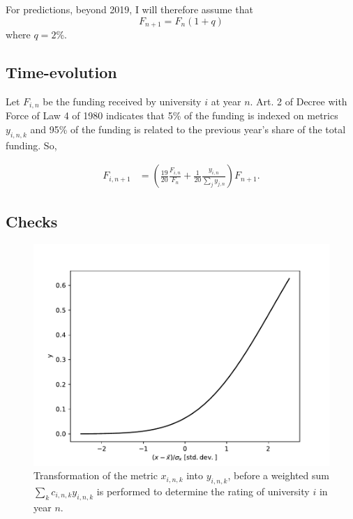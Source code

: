 \documentclass[twocolumn]{article}
\begin{document}
For predictions, beyond 2019, I will therefore assume that
\begin{equation}
    F_{n+1} = F_n (1 + q) \label{eq:F}
\end{equation}
where $q = 2$\%.

\subsection{Time-evolution}
Let $F_{i,n}$ be the funding received by university $i$ at year $n$. Art. 2 of
Decree with Force of Law 4 of 1980 indicates that 5\% of the funding is indexed
on metrics $y_{i,n,k}$ and 95\% of the funding is related to the previous year's
share of the total funding.  So,

\begin{align}
    F_{i,n+1} &= \left( \frac{19}{20} \frac{F_{i,n}}{F_{n}} 
                      + \frac 1{20} \frac{y_{i,n}}{\sum_j y_{j,n}} 
                \right) F_{n+1}.
        \label{eq:afd}
\end{align}


\subsection{Checks}
\begin{figure}
\centering
\includegraphics[width=.85\linewidth]{pdf/transform.pdf}
\caption{Transformation of the metric $x_{i,n,k}$ into $y_{i,n,k}$, before a weighted sum 
$\sum_k c_{i,n,k} y_{i,n,k}$ is performed to determine the rating of university $i$ in year $n$.}
\label{fig:transform}
\end{figure}
\end{document}
